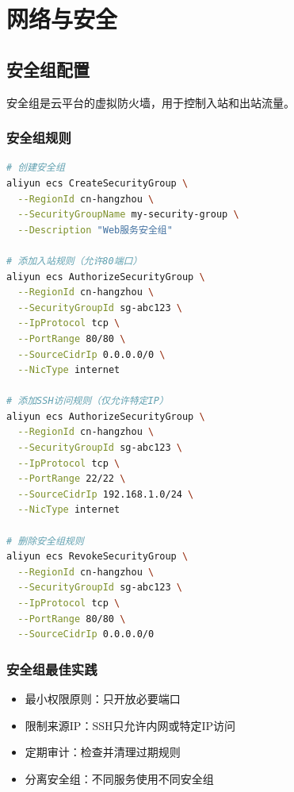 \documentclass[12pt,UTF8]{ctexbook}
\begin{document}
\chapter{网络与安全}
\label{chap:cloud-network-security}

\section{安全组配置}
\label{sec:security-group}

安全组是云平台的虚拟防火墙，用于控制入站和出站流量。

\subsection{安全组规则}

\begin{lstlisting}[language=bash]
# 创建安全组
aliyun ecs CreateSecurityGroup \
  --RegionId cn-hangzhou \
  --SecurityGroupName my-security-group \
  --Description "Web服务安全组"

# 添加入站规则（允许80端口）
aliyun ecs AuthorizeSecurityGroup \
  --RegionId cn-hangzhou \
  --SecurityGroupId sg-abc123 \
  --IpProtocol tcp \
  --PortRange 80/80 \
  --SourceCidrIp 0.0.0.0/0 \
  --NicType internet

# 添加SSH访问规则（仅允许特定IP）
aliyun ecs AuthorizeSecurityGroup \
  --RegionId cn-hangzhou \
  --SecurityGroupId sg-abc123 \
  --IpProtocol tcp \
  --PortRange 22/22 \
  --SourceCidrIp 192.168.1.0/24 \
  --NicType internet

# 删除安全组规则
aliyun ecs RevokeSecurityGroup \
  --RegionId cn-hangzhou \
  --SecurityGroupId sg-abc123 \
  --IpProtocol tcp \
  --PortRange 80/80 \
  --SourceCidrIp 0.0.0.0/0
\end{lstlisting}

\subsection{安全组最佳实践}

\begin{itemize}
    \item 最小权限原则：只开放必要端口
    \item 限制来源IP：SSH只允许内网或特定IP访问
    \item 定期审计：检查并清理过期规则
    \item 分离安全组：不同服务使用不同安全组
\end{itemize}
\end{document}
